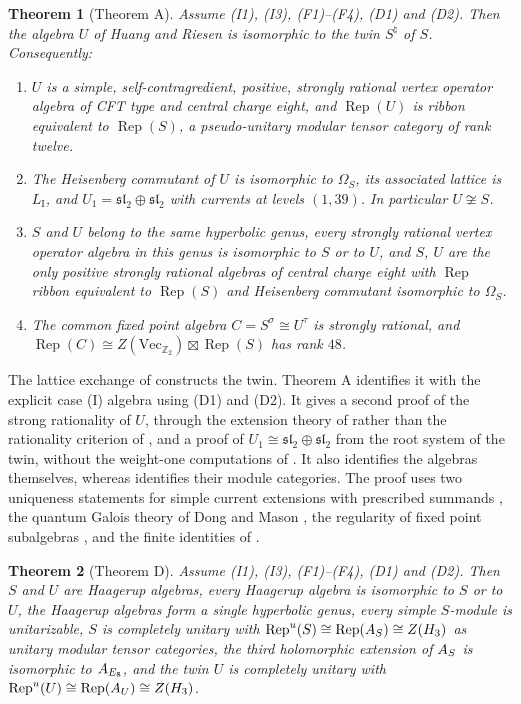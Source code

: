 \documentclass[leqno]{article}
\let\cal\relax
\newcommand{\cal}{\mathcal}
\newcommand{\Z}{\ensuremath{\mathbb{Z}}}
\DeclareMathOperator{\Rep}{Rep}
\newtheorem{thm}{Theorem}[section]
\numberwithin{equation}{section}
\begin{document}
\begin{thm}[Theorem A]
\label{thm:intro-twin}
Assume \textup{(I1)}, \textup{(I3)}, \textup{(F1)}--\textup{(F4)}, \textup{(D1)} and \textup{(D2)}. Then the algebra $U$ of Huang and Riesen is isomorphic to the twin $S^\natural$ of $S$. Consequently:
\begin{enumerate}
\item $U$ is a simple, self-contragredient, positive, strongly rational vertex operator algebra of CFT type and central charge eight, and $\Rep(U)$ is ribbon equivalent to $\Rep(S)$, a pseudo-unitary modular tensor category of rank twelve.
\item The Heisenberg commutant of $U$ is isomorphic to $\Omega_S$, its associated lattice is $L_{\mathrm I}$, and $U_1 = \mathfrak{sl}_2 \oplus \mathfrak{sl}_2$ with currents at levels $(1,39)$. In particular $U \not\cong S$.
\item $S$ and $U$ belong to the same hyperbolic genus, every strongly rational vertex operator algebra in this genus is isomorphic to $S$ or to $U$, and $S$, $U$ are the only positive strongly rational algebras of central charge eight with $\Rep$ ribbon equivalent to $\Rep(S)$ and Heisenberg commutant isomorphic to $\Omega_S$.
\item The common fixed point algebra $C = S^\sigma \cong U^\tau$ is strongly rational, and $\Rep(C) \cong Z(\mathrm{Vec}_{\Z_2}) \boxtimes \Rep(S)$ has rank $48$.
\end{enumerate}
\end{thm}

The lattice exchange of \cite[Theorem 12.3]{Arh26} constructs the twin. Theorem A identifies it with the explicit case (I) algebra using (D1) and (D2). It gives a second proof of the strong rationality of $U$, through the extension theory of \cite{HKL15,CKM22} rather than the rationality criterion of \cite[Theorem 3.1]{DJX26}, and a proof of $U_1 \cong \mathfrak{sl}_2 \oplus \mathfrak{sl}_2$ from the root system of the twin, without the weight-one computations of \cite{Hua26}. It also identifies the algebras themselves, whereas \cite[Proposition 9.2]{DJX26} identifies their module categories. The proof uses two uniqueness statements for simple current extensions with prescribed summands \cite[Proposition 5.3]{DoM04}, the quantum Galois theory of Dong and Mason \cite{DoM97}, the regularity of fixed point subalgebras \cite{CaM16}, and the finite identities of \cite{DJX26}.

\begin{thm}[Theorem D]
\label{thm:intro-consequences}
Assume \textup{(I1)}, \textup{(I3)}, \textup{(F1)}--\textup{(F4)}, \textup{(D1)} and \textup{(D2)}. Then $S$ and $U$ are Haagerup algebras, every Haagerup algebra is isomorphic to $S$ or to $U$, the Haagerup algebras form a single hyperbolic genus, every simple $S$-module is unitarizable, $S$ is completely unitary with $\Rep^u(S) \cong \Rep(\cal A_S) \cong Z(\cal H_3)$ as unitary modular tensor categories, the third holomorphic extension of $\cal A_S$ is isomorphic to $\cal A_{E_8}$, and the twin $U$ is completely unitary with $\Rep^u(U) \cong \Rep(\cal A_U) \cong Z(\cal H_3)$.
\end{thm}
\end{document}
